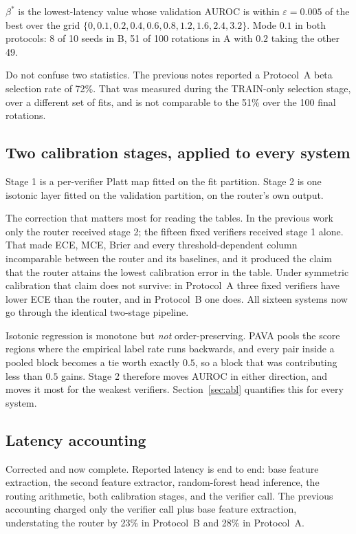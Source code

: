 \documentclass[10pt,a4paper]{article}
\newcommand{\fix}[1]{\textcolor{red!65!black}{#1}}
\begin{document}
$\beta^{*}$ is the lowest-latency value whose validation AUROC is within $\varepsilon=0.005$ of
the best over the grid $\{0,0.1,0.2,0.4,0.6,0.8,1.2,1.6,2.4,3.2\}$. Mode $0.1$ in both
protocols: 8 of 10 seeds in B, 51 of 100 rotations in A with $0.2$ taking the other 49.

\fix{Do not confuse two statistics.} The previous notes reported a Protocol~A beta selection rate
of 72\%. That was measured during the TRAIN-only selection stage, over a different set of fits,
and is not comparable to the 51\% over the 100 final rotations.

\subsection{Two calibration stages, applied to every system}

Stage 1 is a per-verifier Platt map fitted on the fit partition. Stage 2 is one isotonic layer
fitted on the validation partition, on the router's own output.

\fix{The correction that matters most for reading the tables.} In the previous work only the
router received stage 2; the fifteen fixed verifiers received stage 1 alone. That made ECE, MCE,
Brier and every threshold-dependent column incomparable between the router and its baselines, and
it produced the claim that the router attains the lowest calibration error in the table. Under
symmetric calibration that claim does not survive: in Protocol~A three fixed verifiers have lower
ECE than the router, and in Protocol~B one does. All sixteen systems now go through the identical
two-stage pipeline.

Isotonic regression is monotone but \emph{not} order-preserving. PAVA pools the score regions
where the empirical label rate runs backwards, and every pair inside a pooled block becomes a tie
worth exactly $0.5$, so a block that was contributing less than $0.5$ gains. Stage 2 therefore
moves AUROC in either direction, and moves it most for the weakest verifiers.
Section~\ref{sec:abl} quantifies this for every system.

\subsection{Latency accounting}
\label{sec:lat}

\fix{Corrected and now complete.} Reported latency is end to end: base feature extraction, the
second feature extractor, random-forest head inference, the routing arithmetic, both calibration
stages, and the verifier call. The previous accounting charged only the verifier call plus base
feature extraction, understating the router by 23\% in Protocol~B and 28\% in Protocol~A.
\end{document}
